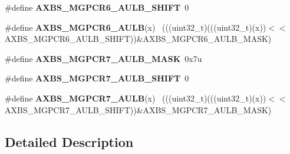 \begin{DoxyCompactItemize}
\item 
\hypertarget{group___a_x_b_s___register___masks_ga2f8f947e92749d8c3a40d2910577bd6e}{}\#define {\bfseries A\+X\+B\+S\+\_\+\+M\+G\+P\+C\+R6\+\_\+\+A\+U\+L\+B\+\_\+\+S\+H\+I\+F\+T}~0\label{group___a_x_b_s___register___masks_ga2f8f947e92749d8c3a40d2910577bd6e}

\item 
\hypertarget{group___a_x_b_s___register___masks_ga49001f5ee73395d91bfcc287c60c305b}{}\#define {\bfseries A\+X\+B\+S\+\_\+\+M\+G\+P\+C\+R6\+\_\+\+A\+U\+L\+B}(x)                                        ~(((uint32\+\_\+t)(((uint32\+\_\+t)(x))$<$$<$A\+X\+B\+S\+\_\+\+M\+G\+P\+C\+R6\+\_\+\+A\+U\+L\+B\+\_\+\+S\+H\+I\+F\+T))\&A\+X\+B\+S\+\_\+\+M\+G\+P\+C\+R6\+\_\+\+A\+U\+L\+B\+\_\+\+M\+A\+S\+K)\label{group___a_x_b_s___register___masks_ga49001f5ee73395d91bfcc287c60c305b}

\item 
\hypertarget{group___a_x_b_s___register___masks_ga7023ba35f92a43f75330e49ebf7d1ddd}{}\#define {\bfseries A\+X\+B\+S\+\_\+\+M\+G\+P\+C\+R7\+\_\+\+A\+U\+L\+B\+\_\+\+M\+A\+S\+K}~0x7u\label{group___a_x_b_s___register___masks_ga7023ba35f92a43f75330e49ebf7d1ddd}

\item 
\hypertarget{group___a_x_b_s___register___masks_ga3d4d33754a5cc2ad461dc51156bcc76f}{}\#define {\bfseries A\+X\+B\+S\+\_\+\+M\+G\+P\+C\+R7\+\_\+\+A\+U\+L\+B\+\_\+\+S\+H\+I\+F\+T}~0\label{group___a_x_b_s___register___masks_ga3d4d33754a5cc2ad461dc51156bcc76f}

\item 
\hypertarget{group___a_x_b_s___register___masks_ga25fdc193c33d60637894a8aa44232a15}{}\#define {\bfseries A\+X\+B\+S\+\_\+\+M\+G\+P\+C\+R7\+\_\+\+A\+U\+L\+B}(x)                                        ~(((uint32\+\_\+t)(((uint32\+\_\+t)(x))$<$$<$A\+X\+B\+S\+\_\+\+M\+G\+P\+C\+R7\+\_\+\+A\+U\+L\+B\+\_\+\+S\+H\+I\+F\+T))\&A\+X\+B\+S\+\_\+\+M\+G\+P\+C\+R7\+\_\+\+A\+U\+L\+B\+\_\+\+M\+A\+S\+K)\label{group___a_x_b_s___register___masks_ga25fdc193c33d60637894a8aa44232a15}

\end{DoxyCompactItemize}


\subsection{Detailed Description}
